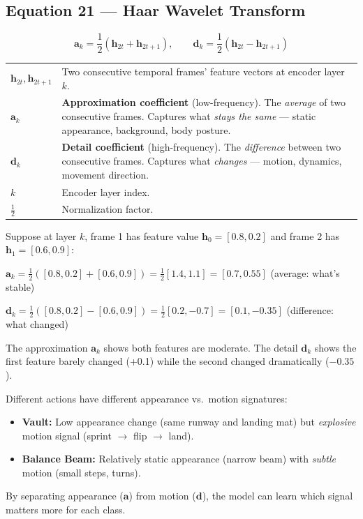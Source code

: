 \documentclass[12pt, a4paper]{article}
\begin{document}
\subsection{Equation 21 --- Haar Wavelet Transform}

\begin{eqbox}
\[
\mathbf{a}_k = \frac{1}{2}(\mathbf{h}_{2t} + \mathbf{h}_{2t+1}), \qquad
\mathbf{d}_k = \frac{1}{2}(\mathbf{h}_{2t} - \mathbf{h}_{2t+1})
\]
\end{eqbox}

\begin{explainbox}
\begin{tabular}{lp{11cm}}
$\mathbf{h}_{2t}, \mathbf{h}_{2t+1}$ & Two consecutive temporal frames' feature vectors at encoder layer $k$.\\[0.2cm]
$\mathbf{a}_k$ & \textbf{Approximation coefficient} (low-frequency). The \textit{average} of two consecutive frames. Captures what \textit{stays the same} --- static appearance, background, body posture.\\[0.2cm]
$\mathbf{d}_k$ & \textbf{Detail coefficient} (high-frequency). The \textit{difference} between two consecutive frames. Captures what \textit{changes} --- motion, dynamics, movement direction.\\[0.2cm]
$k$ & Encoder layer index.\\[0.2cm]
$\frac{1}{2}$ & Normalization factor.
\end{tabular}
\end{explainbox}

\begin{examplebox}
Suppose at layer $k$, frame 1 has feature value $\mathbf{h}_0 = [0.8, 0.2]$ and frame 2 has $\mathbf{h}_1 = [0.6, 0.9]$:

$\mathbf{a}_k = \frac{1}{2}([0.8, 0.2] + [0.6, 0.9]) = \frac{1}{2}[1.4, 1.1] = [0.7, 0.55]$ \quad (average: what's stable)

$\mathbf{d}_k = \frac{1}{2}([0.8, 0.2] - [0.6, 0.9]) = \frac{1}{2}[0.2, -0.7] = [0.1, -0.35]$ \quad (difference: what changed)

The approximation $\mathbf{a}_k$ shows both features are moderate. The detail $\mathbf{d}_k$ shows the first feature barely changed (+0.1) while the second changed dramatically ($-0.35$).
\end{examplebox}

\begin{analogybox}
Different actions have different appearance vs.\ motion signatures:
\begin{itemize}
    \item \textbf{Vault:} Low appearance change (same runway and landing mat) but \textit{explosive} motion signal (sprint $\rightarrow$ flip $\rightarrow$ land).
    \item \textbf{Balance Beam:} Relatively static appearance (narrow beam) with \textit{subtle} motion (small steps, turns).
\end{itemize}
By separating appearance ($\mathbf{a}$) from motion ($\mathbf{d}$), the model can learn which signal matters more for each class.
\end{analogybox}
\end{document}
